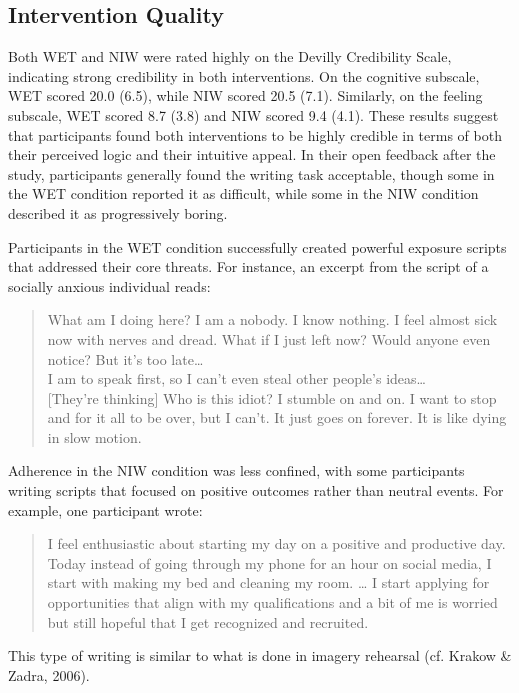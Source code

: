 \documentclass[
  man,floatsintext]{apa7}
\begin{document}
\subsection{Intervention Quality}\label{intervention-quality}

Both WET and NIW were rated highly on the Devilly Credibility Scale, indicating strong credibility in both interventions.
On the cognitive subscale, WET scored 20.0 (6.5), while NIW scored 20.5 (7.1).
Similarly, on the feeling subscale, WET scored 8.7 (3.8) and NIW scored 9.4 (4.1).
These results suggest that participants found both interventions to be highly credible in terms of both their perceived logic and their intuitive appeal.
In their open feedback after the study, participants generally found the writing task acceptable, though some in the WET condition reported it as difficult, while some in the NIW condition described it as progressively boring.

Participants in the WET condition successfully created powerful exposure scripts that addressed their core threats.
For instance, an excerpt from the script of a socially anxious individual reads:

\begin{quote}
What am I doing here? I am a nobody. I know nothing. I feel almost sick now with nerves and dread. What if I just left now? Would anyone even notice? But it's too late\ldots{}\\
I am to speak first, so I can't even steal other people's ideas\ldots{}\\
{[}They're thinking{]} Who is this idiot? I stumble on and on. I want to stop and for it all to be over, but I can't. It just goes on forever. It is like dying in slow motion.
\end{quote}

Adherence in the NIW condition was less confined, with some participants writing scripts that focused on positive outcomes rather than neutral events.
For example, one participant wrote:

\begin{quote}
I feel enthusiastic about starting my day on a positive and productive day.
Today instead of going through my phone for an hour on social media, I start with making my bed and cleaning my room.
\ldots{} I start applying for opportunities that align with my qualifications and a bit of me is worried but still hopeful that I get recognized and recruited.
\end{quote}

This type of writing is similar to what is done in imagery rehearsal (cf. Krakow \& Zadra, 2006).
\end{document}
